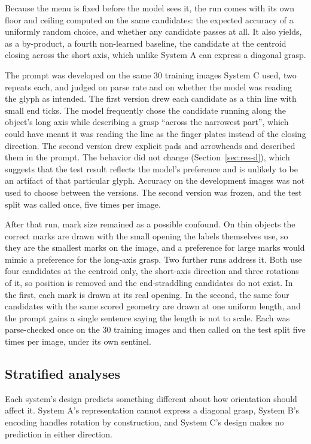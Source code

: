 \documentclass[12pt,letterpaper]{article}
\begin{document}
Because the menu is fixed before the model sees it, the run comes with
its own floor and ceiling computed on the same candidates: the expected
accuracy of a uniformly random choice, and whether any candidate passes
at all. It also yields, as a by-product, a fourth non-learned baseline,
the candidate at the centroid closing across the short axis, which
unlike System A can express a diagonal grasp.

The prompt was developed on the same 30 training images System C used,
two repeats each, and judged on parse rate and on whether the model was
reading the glyph as intended. The first version drew each candidate as
a thin line with small end ticks. The model frequently chose the
candidate running along the object's long axis while describing a grasp
``across the narrowest part'', which could have meant it was reading the
line as the finger plates instead of the closing direction. The second
version drew explicit pads and arrowheads and described them in the
prompt. The behavior did not change (Section~\ref{sec:res-d}), which
suggests that the test result reflects the model's preference and is
unlikely to be an artifact of that particular glyph. Accuracy on the
development images was not used to choose between the versions. The
second version was frozen, and the test split was called once, five
times per image.

After that run, mark size remained as a possible confound. On thin
objects the correct marks are drawn with the small opening the labels
themselves use, so they are the smallest marks on the image, and a
preference for large marks would mimic a preference for the long-axis
grasp. Two further runs address it. Both use four candidates at the
centroid only, the short-axis direction and three rotations of it, so
position is removed and the end-straddling candidates do not exist. In
the first, each mark is drawn at its real opening. In the second, the
same four candidates with the same scored geometry are drawn at one
uniform length, and the prompt gains a single sentence saying the length
is not to scale. Each was parse-checked once on the 30 training images
and then called on the test split five times per image, under its own
sentinel.

\subsection{Stratified analyses}

Each system's design predicts something different about how orientation
should affect it. System A's representation cannot express a diagonal
grasp, System B's encoding handles rotation by construction, and System
C's design makes no prediction in either direction.
\end{document}
